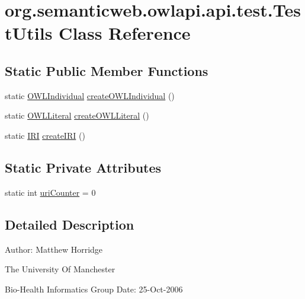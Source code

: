 \hypertarget{classorg_1_1semanticweb_1_1owlapi_1_1api_1_1test_1_1_test_utils}{\section{org.\-semanticweb.\-owlapi.\-api.\-test.\-Test\-Utils Class Reference}
\label{classorg_1_1semanticweb_1_1owlapi_1_1api_1_1test_1_1_test_utils}
}
\subsection*{Static Public Member Functions}
\begin{DoxyCompactItemize}
\item 
static \hyperlink{interfaceorg_1_1semanticweb_1_1owlapi_1_1model_1_1_o_w_l_individual}{O\-W\-L\-Individual} \hyperlink{classorg_1_1semanticweb_1_1owlapi_1_1api_1_1test_1_1_test_utils_a802460518eae9e1e46de9fab7432c556}{create\-O\-W\-L\-Individual} ()
\item 
static \hyperlink{interfaceorg_1_1semanticweb_1_1owlapi_1_1model_1_1_o_w_l_literal}{O\-W\-L\-Literal} \hyperlink{classorg_1_1semanticweb_1_1owlapi_1_1api_1_1test_1_1_test_utils_ade8ad5c6921e17f6f9e1857b835a4454}{create\-O\-W\-L\-Literal} ()
\item 
static \hyperlink{classorg_1_1semanticweb_1_1owlapi_1_1model_1_1_i_r_i}{I\-R\-I} \hyperlink{classorg_1_1semanticweb_1_1owlapi_1_1api_1_1test_1_1_test_utils_a6552ec044844279dfb27ce1f0110cd56}{create\-I\-R\-I} ()
\end{DoxyCompactItemize}
\subsection*{Static Private Attributes}
\begin{DoxyCompactItemize}
\item 
static int \hyperlink{classorg_1_1semanticweb_1_1owlapi_1_1api_1_1test_1_1_test_utils_a844dc3d5f86fcdf597c7aa42203289bb}{uri\-Counter} = 0
\end{DoxyCompactItemize}


\subsection{Detailed Description}
Author\-: Matthew Horridge\par
 The University Of Manchester\par
 Bio-\/\-Health Informatics Group Date\-: 25-\/\-Oct-\/2006 

